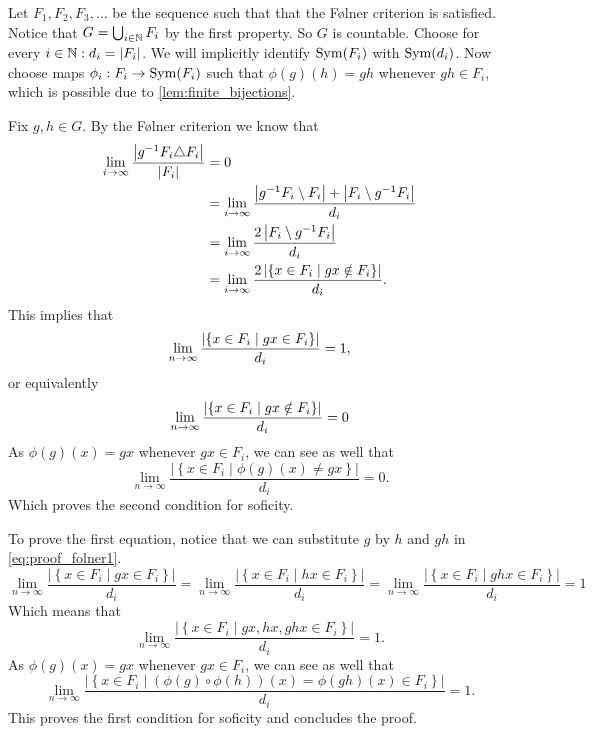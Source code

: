 Let $F_1, F_2, F_3, \dots $ be the sequence such that that the Følner criterion is satisfied. Notice that $G = \bigcup_{i \in \mathbb{N}} F_i$ by the first property. So $G$ is countable. 
Choose for every $i \in \mathbb{N}: d_i = |F_i|$. We will implicitly identify $\operatorname{Sym}(F_i)$ with $\operatorname{Sym}(d_i)$. Now choose maps $\phi_i: F_i \to \operatorname{Sym}(F_i)$ such that $\phi(g)(h) = gh$ whenever $gh \in F_i$, which is possible due to \cref{lem:finite_bijections}. 

Fix $g, h \in G$. By the Følner criterion we know that
\begin{align*}
    \lim_{i\to \infty} \frac{\left| g^{-1}F_i \triangle F_i \right|}{\left| F_i \right|} &= 0\\
    &= \lim_{i\to \infty} \frac{\left| g^{-1}F_i \setminus F_i \right| + \left| F_i \setminus g^{-1}F_i \right|}{d_i}\\
    &= \lim_{i\to \infty} \frac{2\left|  F_i \setminus g^{-1}F_i  \right|}{d_i}\\
    &= \lim_{i\to \infty} \frac{2\left| \left\{ x \in F_i \mid gx \notin F_i \right\} \right|}{d_i}. 
\end{align*}
This implies that \begin{equation}
    \lim_{n\to \infty} \frac{\left| \left\{ x \in F_i \mid gx \in F_i \right\} \right|}{d_i} = 1,
\end{equation}
or equivalently 
\begin{equation}\label{eq:proof_folner1}
    \lim_{n\to \infty} \frac{\left| \left\{ x \in F_i \mid gx \notin F_i \right\} \right|}{d_i} = 0
\end{equation}
As $\phi(g)(x) = gx$ whenever $gx \in F_i$, we can see as well that 
$$\lim_{n\to \infty} \frac{\left|\left\{ x \in F_i \mid \phi(g)(x)\ne gx \right\}\right|}{d_i} = 0.$$
Which proves the second condition for soficity. 

To prove the first equation, notice that we can substitute $g$ by $h$ and $gh$ in \cref{eq:proof_folner1}.
$$ \lim_{n\to \infty} \frac{\left|\left\{ x \in F_i \mid gx \in F_i \right\}\right|}{d_i} =
\lim_{n\to \infty} \frac{\left|\left\{ x \in F_i \mid hx \in F_i \right\}\right|}{d_i} =
\lim_{n\to \infty} \frac{\left|\left\{ x \in F_i \mid ghx \in F_i \right\}\right|}{d_i}= 1$$
Which means that 
$$\lim_{n\to \infty} \frac{\left|\left\{ x \in F_i \mid gx,hx,ghx \in F_i \right\}\right|}{d_i}= 1.$$
As $\phi(g)(x) = gx$ whenever $gx \in F_i$, we can see as well that
$$\lim_{n\to \infty} \frac{\left|\left\{ x \in F_i \mid (\phi(g) \circ\phi(h))(x) = \phi(gh)(x) \in F_i \right\}\right|}{d_i}= 1.$$
This proves the first condition for soficity and concludes the proof. 